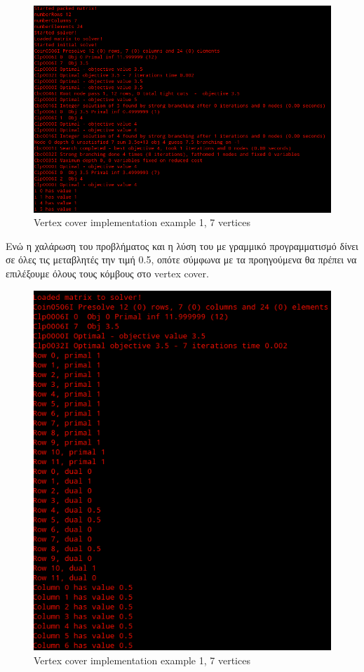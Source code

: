 \begin{figure}[H]
\caption{Vertex cover implementation example 1, 7 vertices}
\centering
\includegraphics[width=1.3\textwidth]{Figures/sol_int.png}\centering
\end{figure}

Ενώ η χαλάρωση του προβλήματος και η λύση του με γραμμικό προγραμματισμό δίνει σε όλες τις μεταβλητές την τιμή 0.5, οπότε σύμφωνα με τα προηγούμενα θα πρέπει να επιλέξουμε όλους τους κόμβους στο vertex cover.

\begin{figure}[H]
\caption{Vertex cover implementation example 1, 7 vertices}
\centering
\includegraphics[width=1.1\textwidth]{Figures/sol_frac.png}\centering
\end{figure}